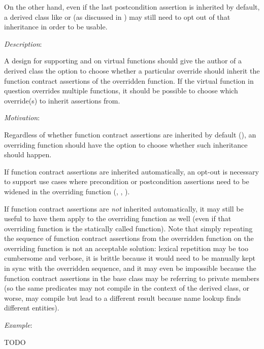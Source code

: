 On the other hand, even if the last postcondition assertion is inherited by default, a derived class like  or  (as discussed in ) may still need to opt out of that inheritance in order to be usable.


\emph{Description}:

A design for supporting  and  on virtual functions should give the author of a derived class the option to choose whether a particular override should inherit the function contract assertions of the overridden function. If the virtual function in question overrides multiple functions, it should be possible to choose which override(s) to inherit assertions from.

\emph{Motivation}:

Regardless of whether function contract assertions are inherited by default (), an overriding function should have the option to choose whether such inheritance should happen.

If function contract assertions are inherited automatically, an opt-out is necessary to support use cases where precondition or postcondition assertions need to be widened in the overriding function (, , ). 

If function contract assertions are \emph{not} inherited automatically, it may still be useful to have them apply to the overriding function as well (even if that overriding function is the statically called function). Note that simply repeating the sequence of function contract assertions from the overridden function on the overriding function is not an acceptable solution: lexical repetition may be too cumbersome and verbose, it is brittle because it would need to be manually kept in sync with the overridden sequence, and it may even be impossible because the function contract assertions in the base class may be referring to private members (so the same predicates may not compile in the context of the derived class, or worse, may compile but lead to a different result because name lookup finds different entities).

\emph{Example}:

TODO



